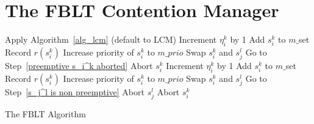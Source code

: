 \documentclass[a4paper,english]{article}
\begin{document}
\section{The FBLT Contention Manager}
\label{sec:fblt design}

\begin{algorithm}[h!]
\footnotesize{
\LinesNumbered
{}
{
Apply Algorithm~\ref{alg_lcm} (default to LCM)\label{apply lcm}\;
{
{
Increment $\eta_i^k$ by 1\label{increment eta 1}\;
}
{
Add $s_i^k$ to $m\_$set\label{add to m_set 1}\;
Record $r(s_i^k)$\label{record 1}\;
Increase priority of $s_i^k$ to $m\_prio$\label{increase priority 1}\;
}
}
{
Swap $s_i^k$ and $s_j^l$\;
Go to Step~\ref{preemptive s_i^k aborted}\;
}
}
{
Abort $s_i^k$\;
{
Increment $\eta_i^k$ by 1\label{increment eta 2}\;
}
{
Add $s_i^k$ to $m\_$set\label{add to m_set 2}\;
Record $r(s_i^k)$\label{record 2}\;
Increase priority of $s_i^k$ to $m\_prio$\label{increase priority 2}\;
}
}
{
Swap $s_i^k$ and $s_j^l$\;
Go to Step~\ref{s_j^l is non preemptive}\label{end preemptive and non preemptive}\;
}
\Else
{
\label{both non preemptive}
{	
Abort $s_j^l$\label{s_i^k first in m_set}\;
}
{
Abort $s_i^k$\label{s_j^l first in m_set}\;
}
}
}
\caption{The FBLT Algorithm}\label{fblt-algorithm}
\end{algorithm}
\end{document}
